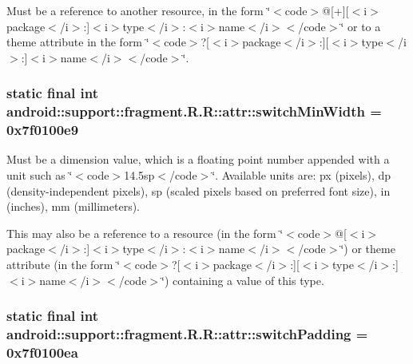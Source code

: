 Must be a reference to another resource, in the form \char`\"{}$<$code$>$@\mbox{[}+\mbox{]}\mbox{[}$<$i$>$package$<$/i$>$:\mbox{]}$<$i$>$type$<$/i$>$:$<$i$>$name$<$/i$>$$<$/code$>$\char`\"{} or to a theme attribute in the form \char`\"{}$<$code$>$?\mbox{[}$<$i$>$package$<$/i$>$:\mbox{]}\mbox{[}$<$i$>$type$<$/i$>$:\mbox{]}$<$i$>$name$<$/i$>$$<$/code$>$\char`\"{}. \hypertarget{classandroid_1_1support_1_1fragment_1_1_r_1_1attr_2382f267c86fed429564074cc4549cf1}{
\subsubsection[{switchMinWidth}]{\setlength{\rightskip}{0pt plus 5cm}static final int android::support::fragment.R.R::attr::switchMinWidth = 0x7f0100e9}}
\label{classandroid_1_1support_1_1fragment_1_1_r_1_1attr_2382f267c86fed429564074cc4549cf1}


Must be a dimension value, which is a floating point number appended with a unit such as \char`\"{}$<$code$>$14.5sp$<$/code$>$\char`\"{}. Available units are: px (pixels), dp (density-independent pixels), sp (scaled pixels based on preferred font size), in (inches), mm (millimeters). 

This may also be a reference to a resource (in the form \char`\"{}$<$code$>$@\mbox{[}$<$i$>$package$<$/i$>$:\mbox{]}$<$i$>$type$<$/i$>$:$<$i$>$name$<$/i$>$$<$/code$>$\char`\"{}) or theme attribute (in the form \char`\"{}$<$code$>$?\mbox{[}$<$i$>$package$<$/i$>$:\mbox{]}\mbox{[}$<$i$>$type$<$/i$>$:\mbox{]}$<$i$>$name$<$/i$>$$<$/code$>$\char`\"{}) containing a value of this type. \hypertarget{classandroid_1_1support_1_1fragment_1_1_r_1_1attr_dca936b6160d159ddadab9f32b4be748}{
\subsubsection[{switchPadding}]{\setlength{\rightskip}{0pt plus 5cm}static final int android::support::fragment.R.R::attr::switchPadding = 0x7f0100ea}}
\label{classandroid_1_1support_1_1fragment_1_1_r_1_1attr_dca936b6160d159ddadab9f32b4be748}


